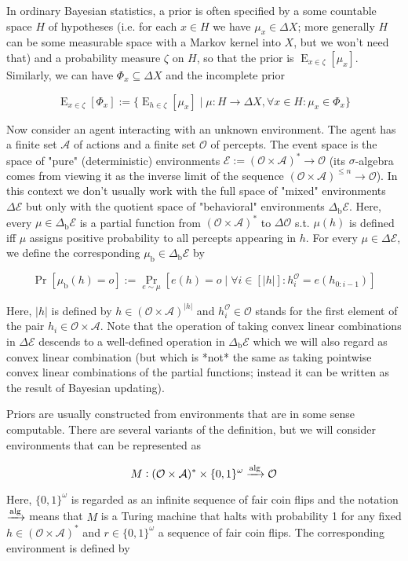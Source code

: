 \documentclass[a4paper]{article}
\newcommand{\Bool}{\{0,1\}}
\newcommand{\Sagas}{{\Bool^\omega}}
\DeclareMathOperator{\Prb}{Pr}
\DeclareMathOperator{\E}{E}
\newcommand{\Abs}[1]{\lvert #1 \rvert}
\newcommand{\Alg}{\xrightarrow{\textnormal{alg}}}
\newcommand{\SP}[1]{\Delta #1}
\newcommand{\Act}{\mathcal{A}}
\newcommand{\Per}{\mathcal{O}}
\newcommand{\His}{(\Per \times \Act)^*}
\newcommand{\Env}{\mathcal{E}}
\newcommand{\Beh}{\Delta_{\operatorname{b}}}
\newcommand{\EnvB}{\Beh\Env}
\begin{document}
In ordinary Bayesian statistics, a prior is often specified by a some countable space ${H}$ of hypotheses (i.e. for each ${x \in H}$ we have ${\mu_x \in \SP{X}}$; more generally ${H}$ can be some measurable space with a Markov kernel into ${X}$, but we won't need that) and a probability measure ${\zeta}$ on ${H}$, so that the prior is ${\E_{x \in \zeta}[\mu_x]}$. Similarly, we can have ${\Phi_x \subseteq \SP{X}}$ and the incomplete prior

$${\E_{x \in \zeta}[\Phi_x]:=\{\E_{h \in \zeta}[\mu_x] \mid \mu: H \rightarrow \SP{X}, \forall x \in H: \mu_x \in \Phi_x\}}$$

Now consider an agent interacting with an unknown environment. The agent has a finite set ${\Act}$ of actions and a finite set ${\Per}$ of percepts. The event space is the space of "pure" (deterministic) environments ${\Env:=\His \rightarrow \Per}$ (its ${\sigma}$-algebra comes from viewing it as the inverse limit of the sequence ${(\Per \times \Act)^{\leq n} \rightarrow \Per}$). In this context we don't usually work with the full space of "mixed" environments ${\SP{\Env}}$ but only with the quotient space of "behavioral" environments  ${\EnvB}$. Here, every ${\mu \in \EnvB}$ is a partial function from ${\His}$ to ${\SP{\Per}}$ s.t. ${\mu(h)}$ is defined iff ${\mu}$ assigns positive probability to all percepts appearing in ${h}$. For every ${\mu \in \SP{\Env}}$, we define the corresponding ${\mu_{\operatorname{b}} \in \EnvB}$ by

$$\Prb[\mu_{\operatorname{b}}(h)=o]:=\Prb_{e \sim \mu}[e(h) = o \mid \forall i \in [\Abs{h}]: h^\Per_{i} = e(h_{0:i-1})]$$

Here, ${\Abs{h}}$ is defined by ${h \in (\Per \times \Act)^{\Abs{h}}}$ and ${h^\Per_{i} \in \Per}$ stands for the first element of the pair ${h_i \in \Per \times \Act}$. Note that the operation of taking convex linear combinations in ${\SP{\Env}}$ descends to a well-defined operation in ${\EnvB}$ which we will also regard as convex linear combination (but which is *not* the same as taking pointwise convex linear combinations of the partial functions; instead it can be written as the result of Bayesian updating). 

Priors are usually constructed from environments that are in some sense computable. There are several variants of the definition, but we will consider environments that can be represented as

$${M: \His \times \Sagas \Alg \Per}$$

Here, ${\Sagas}$ is regarded as an infinite sequence of fair coin flips and the notation ${\Alg}$ means that ${M}$ is a Turing machine that halts with probability 1 for any fixed ${h \in \His}$ and ${r \in \Sagas}$ a sequence of fair coin flips. The corresponding environment is defined by 
\end{document}
